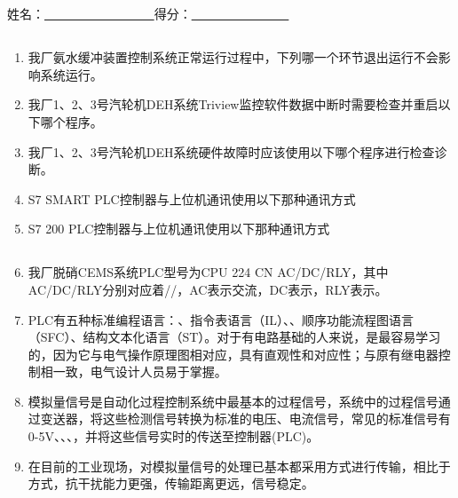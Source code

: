 \documentclass{book}
\begin{document}
\else						%
\fi						%
		\chapter[2024年02月份技术培训考试]{	\hspace*{-0.3em}}
		姓名：\uline{ \ \  \  \ \ \ \ \ \ \ \ \ \ \ \ \ \ }\hfill 得分：\uline{ \ \  \  \ \ \ \ \ \  \ \ \ \ \ \ }
		\section{}
			\begin{enumerate}
				\item 我厂氨水缓冲装置控制系统正常运行过程中，下列哪一个环节退出运行不会影响系统运行。
				\item 我厂1、2、3号汽轮机DEH系统Triview监控软件数据中断时需要检查并重启以下哪个程序。
				\item 我厂1、2、3号汽轮机DEH系统硬件故障时应该使用以下哪个程序进行检查诊断。
				\item S7 SMART PLC控制器与上位机通讯使用以下那种通讯方式
				\item  S7 200 PLC控制器与上位机通讯使用以下那种通讯方式
			\end{enumerate}
		\section{}
			\begin{enumerate}
				\setcounter{enumi}{5}
				\item 我厂脱硝CEMS系统PLC型号为CPU 224 CN AC/DC/RLY，其中AC/DC/RLY分别对应着//，AC表示交流，DC表示，RLY表示。
				\item PLC有五种标准编程语言：、指令表语言（IL）、、顺序功能流程图语言（SFC）、结构文本化语言（ST）。对于有电路基础的人来说，是最容易学习的，因为它与电气操作原理图相对应，具有直观性和对应性；与原有继电器控制相一致，电气设计人员易于掌握。
				\item 模拟量信号是自动化过程控制系统中最基本的过程信号，系统中的过程信号通过变送器，将这些检测信号转换为标准的电压、电流信号，常见的标准信号有0-5V、、、，并将这些信号实时的传送至控制器(PLC)。
				\item 在目前的工业现场，对模拟量信号的处理已基本都采用方式进行传输，相比于方式，抗干扰能力更强，传输距离更远，信号稳定。
			\end{enumerate}
\end{document}
